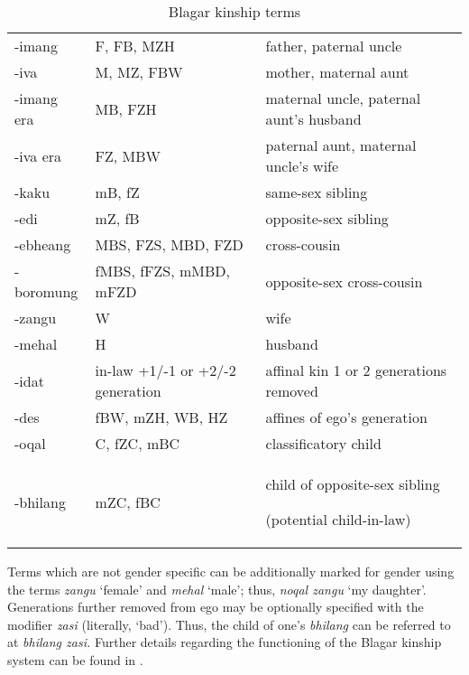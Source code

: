 \begin{table}\centering


\begin{tabular}{p{3cm}p{3cm}p{5cm}}
{}-imang & F, FB, MZH & father, paternal uncle\\
{}-iva & M, MZ, FBW & mother, maternal aunt\\
{}-imang era & MB, FZH & maternal uncle, paternal aunt's husband\\
{}-iva era & FZ, MBW & paternal aunt, maternal uncle's wife\\
{}-kaku & mB, fZ & same-sex sibling\\
{}-edi & mZ, fB & opposite-sex sibling\\
{}-ebheang & MBS, FZS, MBD, FZD & cross-cousin\\
{}-boromung & fMBS, fFZS, mMBD, mFZD & opposite-sex cross-cousin\\
{}-zangu & W & wife\\
{}-mehal & H & husband\\
{}-idat & in-law +1/-1 or +2/-2 generation & affinal kin 1 or 2 generations removed\\
{}-des & fBW, mZH, WB, HZ & affines of ego's generation\\
{}-oqal & C, fZC, mBC & classificatory child\\
{}-bhilang & mZC, fBC & child of opposite-sex sibling

(potential child-in-law)\\
\end{tabular}

\caption{Blagar kinship terms}
\end{table}

Terms which are not gender specific can be additionally marked for gender using the terms \textit{zangu} `female' and \textit{mehal} `male'; thus, \textit{noqal zangu} `my daughter'. Generations further removed from ego may be optionally specified with the modifier \textit{zasi} (literally, `bad'). Thus, the child of one's \textit{bhilang} can be referred to at \textit{bhilang zasi.} Further details regarding the functioning of the Blagar kinship system can be found in \citet{Steinhauer1993}.

